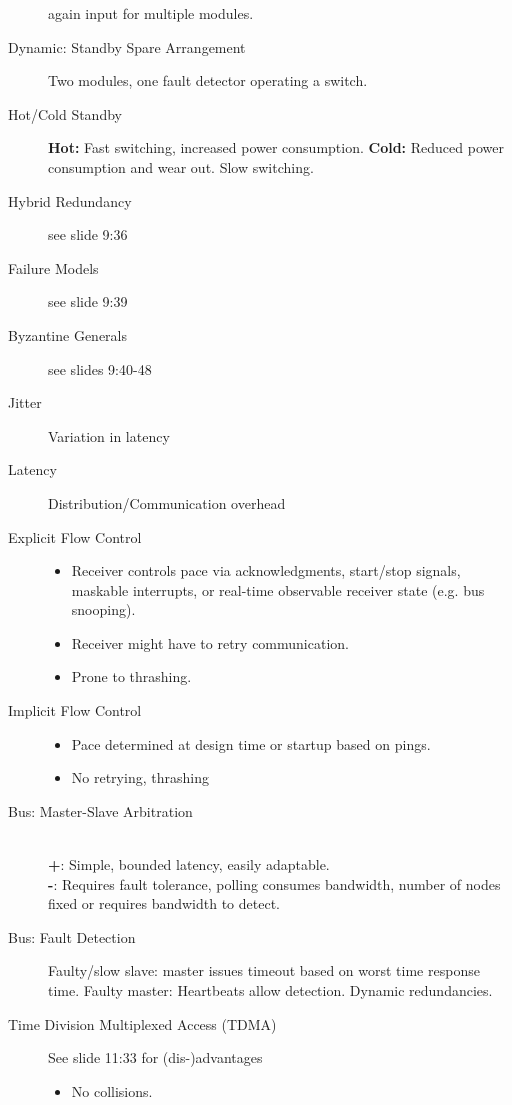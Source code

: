 \begin{description}
    again input for multiple modules.
    \item[Dynamic: Standby Spare Arrangement] Two modules, one fault detector
    operating a switch.
    \item[Hot/Cold Standby] \textbf{Hot:} Fast switching, increased power
    consumption. \textbf{Cold:} Reduced power consumption and wear out. Slow
    switching.
    \item[Hybrid Redundancy] see slide 9:36 
    \item[Failure Models] see slide 9:39 
    \item[Byzantine Generals] see slides 9:40-48
    \item[Jitter] Variation in latency
    \item[Latency] Distribution/Communication overhead
    \item[Explicit Flow Control] 
    \begin{itemize}
        \item Receiver controls pace via acknowledgments,
        start/stop signals, maskable interrupts, or real-time observable receiver
        state (e.g. bus snooping).
        \item Receiver might have to retry communication.
        \item Prone to thrashing.
    \end{itemize}
    \item[Implicit Flow Control] 
    \begin{itemize}
        \item Pace determined at design time or startup based on \eg pings.
        \item No retrying, thrashing
    \end{itemize}
    \item[Bus: Master-Slave Arbitration]\ \\
    \textbf{+}: Simple, bounded latency, easily adaptable.\\
    \textbf{-}: Requires fault tolerance, polling consumes bandwidth, number of
    nodes fixed or requires bandwidth to detect.
    \item[Bus: Fault Detection] Faulty/slow slave: master issues timeout based
    on worst time response time. Faulty master: Heartbeats allow detection.
    Dynamic redundancies.
    \item[Time Division Multiplexed Access (TDMA)] See slide 11:33 for 
    (dis-)advantages 
    \begin{itemize}
        \item No collisions.

\end{itemize}
\end{description}
